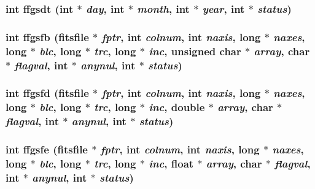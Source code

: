 \subsubsection{\setlength{\rightskip}{0pt plus 5cm}int ffgsdt (int $\ast$ {\em day}, int $\ast$ {\em month}, int $\ast$ {\em year}, int $\ast$ {\em status})}\label{test_2roimasker_2fitsio_8h_e7df3dbfb42a9a6a6a54e6ed084f5f03}


\subsubsection{\setlength{\rightskip}{0pt plus 5cm}int ffgsfb (\bf{fitsfile} $\ast$ {\em fptr}, int {\em colnum}, int {\em naxis}, long $\ast$ {\em naxes}, long $\ast$ {\em blc}, long $\ast$ {\em trc}, long $\ast$ {\em inc}, unsigned char $\ast$ {\em array}, char $\ast$ {\em flagval}, int $\ast$ {\em anynul}, int $\ast$ {\em status})}\label{test_2roimasker_2fitsio_8h_eec81cbe16bbd72a2ccc01e2b39ccc19}


\subsubsection{\setlength{\rightskip}{0pt plus 5cm}int ffgsfd (\bf{fitsfile} $\ast$ {\em fptr}, int {\em colnum}, int {\em naxis}, long $\ast$ {\em naxes}, long $\ast$ {\em blc}, long $\ast$ {\em trc}, long $\ast$ {\em inc}, double $\ast$ {\em array}, char $\ast$ {\em flagval}, int $\ast$ {\em anynul}, int $\ast$ {\em status})}\label{test_2roimasker_2fitsio_8h_beeb182f75ceb2f94e28d9653b7fd612}


\subsubsection{\setlength{\rightskip}{0pt plus 5cm}int ffgsfe (\bf{fitsfile} $\ast$ {\em fptr}, int {\em colnum}, int {\em naxis}, long $\ast$ {\em naxes}, long $\ast$ {\em blc}, long $\ast$ {\em trc}, long $\ast$ {\em inc}, float $\ast$ {\em array}, char $\ast$ {\em flagval}, int $\ast$ {\em anynul}, int $\ast$ {\em status})}\label{test_2roimasker_2fitsio_8h_a8b0872e27d9bd6b655586b7cbb4ab2a}


